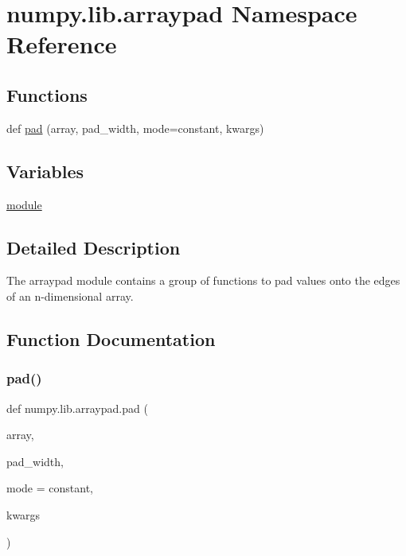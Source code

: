 \hypertarget{namespacenumpy_1_1lib_1_1arraypad}{}\section{numpy.\+lib.\+arraypad Namespace Reference}
\label{namespacenumpy_1_1lib_1_1arraypad}
\subsection*{Functions}
\begin{DoxyCompactItemize}
\item 
def \hyperlink{namespacenumpy_1_1lib_1_1arraypad_acda665bd97b568be047b86ea326e9f2f}{pad} (array, pad\+\_\+width, mode=\textquotesingle{}constant\textquotesingle{}, kwargs)
\end{DoxyCompactItemize}
\subsection*{Variables}
\begin{DoxyCompactItemize}
\item 
\hyperlink{namespacenumpy_1_1lib_1_1arraypad_ad8da0f592030d00ff3a1a6617431b387}{module}
\end{DoxyCompactItemize}


\subsection{Detailed Description}
\begin{DoxyVerb}The arraypad module contains a group of functions to pad values onto the edges
of an n-dimensional array.\end{DoxyVerb}
 

\subsection{Function Documentation}
\mbox{\label{namespacenumpy_1_1lib_1_1arraypad_acda665bd97b568be047b86ea326e9f2f}} 
\subsubsection{\texorpdfstring{pad()}{pad()}}
{\footnotesize\ttfamily def numpy.\+lib.\+arraypad.\+pad (\begin{DoxyParamCaption}\item[{}]{array,  }\item[{}]{pad\+\_\+width,  }\item[{}]{mode = {\ttfamily \textquotesingle{}constant\textquotesingle{}},  }\item[{}]{kwargs }\end{DoxyParamCaption})}

